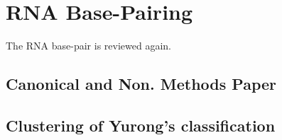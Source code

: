 \chapter{RNA Base-Pairing}
\label{basepairs} 

The RNA base-pair is reviewed again.
\section{Canonical and Non. Methods Paper}
\section{Clustering of Yurong's classification}



